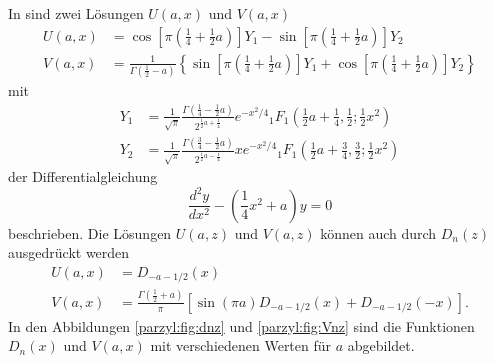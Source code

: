 In \cite{parzyl:abramowitz-stegun} sind zwei Lösungen $U(a, x)$ und $V(a,x)$ 
\begin{align}
    U(a,x) &= 
    \cos\left[\pi \left({\textstyle \frac{1}{4}} + {\textstyle \frac{1}{2}} a\right)\right] Y_1
    - \sin\left[\pi \left({\textstyle \frac{1}{4}} + {\textstyle \frac{1}{2}} a\right)\right] Y_2 
    \label{parzyl:eq:Uaz}
    \\
    V(a,x) &= \frac{1}{\Gamma \left({\textstyle \frac{1}{2} - a}\right)} \left\{
    \sin\left[\pi \left({\textstyle \frac{1}{4}} + {\textstyle \frac{1}{2}} a\right)\right] Y_1
    + \cos\left[\pi \left({\textstyle \frac{1}{4}} + {\textstyle \frac{1}{2}} a\right)\right] Y_2
    \right\}
    \label{parzyl:eq:Vaz}
\end{align}
mit
\begin{align}
    Y_1 &= \frac{1}{\sqrt{\pi}} 
            \frac{\Gamma\left({\textstyle \frac{1}{4} - 
            {\textstyle \frac{1}{2}}a}\right)}
            {2^{\frac{1}{2} a + \frac{1}{4}}}
            e^{-x^2/4} 
            {}_{1} F_{1}
                \left({\textstyle \frac{1}{2}}a + {\textstyle \frac{1}{4}}, 
                {\textstyle \frac{1}{2}} ; 
                {\textstyle \frac{1}{2}}x^2\right)\\
        Y_2 &= \frac{1}{\sqrt{\pi}} 
            \frac{\Gamma\left({\textstyle \frac{3}{4} - 
            {\textstyle \frac{1}{2}}a}\right)}
            {2^{\frac{1}{2} a - \frac{1}{4}}} 
            x e^{-x^2/4} 
            {}_{1} F_{1}
                \left({\textstyle \frac{1}{2}}a + {\textstyle \frac{3}{4}}, 
                {\textstyle \frac{3}{2}} ; 
                {\textstyle \frac{1}{2}}x^2\right)
\end{align}
der Differentialgleichung
\begin{equation}
    \frac{d^2 y}{d x^2} - \left(\frac{1}{4} x^2 + a\right) y = 0
\end{equation}
beschrieben. Die Lösungen $U(a,z)$ und $V(a, z)$ können auch durch $D_n(z)$
ausgedrückt werden
\begin{align}
    U(a,x) &= D_{-a-1/2}(x) \\
    V(a,x) &= \frac{\Gamma \left({\textstyle \frac{1}{2}} + a\right)}{\pi}
    \left[\sin\left(\pi a\right) D_{-a-1/2}(x) + D_{-a-1/2}(-x)\right].
\end{align}
In den Abbildungen \ref{parzyl:fig:dnz} und \ref{parzyl:fig:Vnz} sind 
die Funktionen $D_n(x)$ und $V(a,x)$ mit verschiedenen Werten für $a$ abgebildet.
